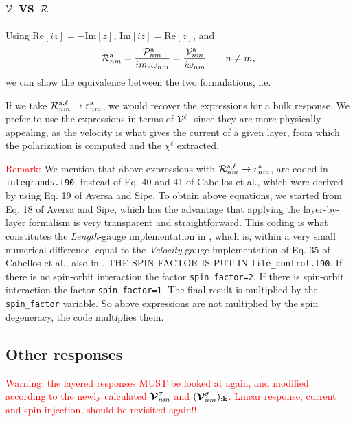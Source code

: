 \subsection{${\mathbf{\cal V}}$ vs ${\cal R}$}

Using 
$\mathrm{Re}[iz]=-\mathrm{Im}[z]$,
$\mathrm{Im}[iz]=\mathrm{Re}[z]$,
and
\begin{equation}\label{rnmenm91}
{\cal R}^{\mathrm{a}}_{nm}=\frac{{\cal P}^{\mathrm{a}}_{nm}}{im_e\omega_{nm}}=\frac{{\mathbf{\cal V}}^{\mathrm{a}}_{nm}}{i\omega_{nm}}
\quad\quad n\ne m
,
\end{equation}
we can show the equivalence between the two formulations, i.e.

\noindent If we take ${\cal R}^{\mathrm{a},\ell}_{nm}\to r^{\mathrm{a}}_{nm}$, 
we
would recover the expressions for a bulk response.
We prefer to use the expressions in terms of ${\mathbf{\cal V}}^\ell$, since they are
more physically appealing, as the velocity is what gives the current
of a given layer, from which the polarization is computed and the
$\chi^\ell$ extracted.   

\textcolor{red}{Remark:} We mention that above expressions with 
${\cal R}^{\mathrm{a},\ell}_{nm}\to r^{\mathrm{a}}_{nm}$, are coded in
\verb=integrands.f90=, instead of Eq. 40 and 41 of Cabellos et
al.\cite{cabellosPRB09}, which were derived by using Eq. 19 of Aversa
and Sipe.\cite{aversaPRB95} To obtain above equations, we started
from Eq. 18 of Aversa and Sipe,\cite{aversaPRB95} which has the
advantage that applying the layer-by-layer formalism is very
transparent and straightforward. This coding is what constitutes the
{\it Length}-gauge implementation in \tiniba, which is, within a very
small numerical difference, equal to the {\it Velocity}-gauge
implementation of Eq. 35 of Cabellos et al.\cite{cabellosPRB09}, also
in \tiniba. 
{\color{red} THE SPIN FACTOR IS PUT IN
}\verb=file_control.f90=. 
If there is no spin-orbit interaction the 
factor \Verb+spin_factor=2+.  
If there is spin-orbit interaction the 
factor \Verb+spin_factor=1+. The final result is multiplied by  
the \verb=spin_factor= variable. So above expressions are not
multiplied by the spin degeneracy, the code multiplies them.   
\subsection{Other responses}

\textcolor{red}{Warning: the layered responses MUST be looked at
  again, and modified according to the newly calculated 
$\boldsymbol{\mathcal{\cal V}}^\sigma_{nm}$  and
$(\boldsymbol{\mathcal{\cal V}}^\sigma_{nm})_{;\mathbf{k}}$. Linear response, current and
spin injection, should be revisited again!!}
 
